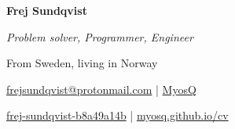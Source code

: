 \documentclass[11pt, a4paper]{article}
\begin{document}
\noindent
\begin{minipage}{0.25\textwidth}

\end{minipage}%
\begin{minipage}{0.75\textwidth}
    \centerline{
        \Large\bfseries Frej Sundqvist
    }
    \vspace{0.2em}
    \centerline{
        \textit{Problem solver, Programmer, Engineer}
    }
    \centerline{
        From Sweden, living in Norway
    }
    \vspace{0.5em}
    \centerline{
        {\faEnvelopeO} \href{mailto:frejsundqvist@protonmail.com}{frejsundqvist@protonmail.com}
        |
        {\faGithub} \href{https://github.com/MyosQ}{MyosQ}
    }
    \centerline{
        {\faLinkedin} \href{https://linkedin.com/in/frej-sundqvist-b8a49a14b}{frej-sundqvist-b8a49a14b}
        |
        {\faGlobe} \href{https://myosq.github.io/cv}{myosq.github.io/cv}    
    }
\end{minipage}

\vspace{1em}
\end{document}
